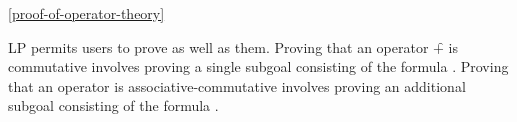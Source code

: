 \ref{proof-of-operator-theory}

LP permits users to prove  as well as
 them.  Proving that an operator \f{+} is commutative involves
proving a single subgoal consisting of the formula .  Proving
that an operator is associative-commutative involves proving an additional
subgoal consisting of the formula .
